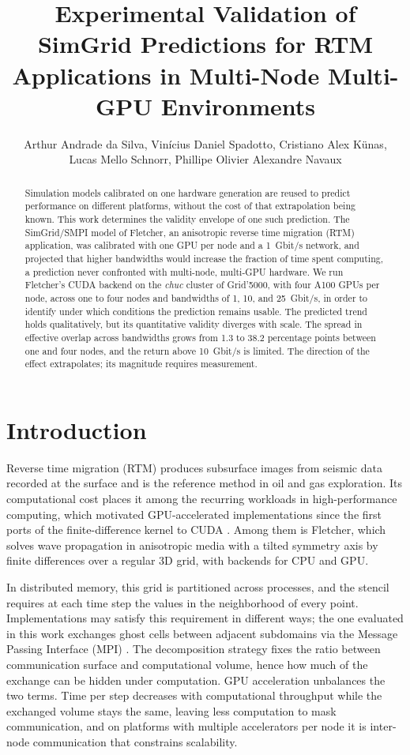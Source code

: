 \documentclass[12pt]{article}
\title{Experimental Validation of SimGrid Predictions for RTM Applications in Multi-Node Multi-GPU Environments}
\author{Arthur Andrade da Silva\inst{1}, Vin{\'i}cius Daniel Spadotto\inst{1}, Cristiano Alex Künas\inst{1},\\
Lucas Mello Schnorr\inst{1}, Phillipe Olivier Alexandre Navaux\inst{1}}
\begin{document}
 
\maketitle

\begin{abstract}
Simulation models calibrated on one hardware generation are reused to predict performance on different platforms, without the cost of that extrapolation being known. This work determines the validity envelope of one such prediction. The SimGrid/SMPI model of Fletcher, an anisotropic reverse time migration (RTM) application, was calibrated with one GPU per node and a 1~Gbit/s network, and projected that higher bandwidths would increase the fraction of time spent computing, a prediction never confronted with multi-node, multi-GPU hardware. We run Fletcher's CUDA backend on the \textit{chuc} cluster of Grid'5000, with four A100 GPUs per node, across one to four nodes and bandwidths of 1, 10, and 25~Gbit/s, in order to identify under which conditions the prediction remains usable. The predicted trend holds qualitatively, but its quantitative validity diverges with scale. The spread in effective overlap across bandwidths grows from 1.3 to 38.2 percentage points between one and four nodes, and the return above 10~Gbit/s is limited. The direction of the effect extrapolates; its magnitude requires measurement.
\end{abstract}

\section{Introduction}
Reverse time migration (RTM) produces subsurface images from seismic data recorded at the surface and is the reference method in oil and gas exploration. Its computational cost places it among the recurring workloads in high-performance computing, which motivated GPU-accelerated implementations since the first ports of the finite-difference kernel to CUDA \cite{micikevicius2009fd3d}. Among them is Fletcher, which solves wave propagation in anisotropic media with a tilted symmetry axis by finite differences over a regular 3D grid, with backends for CPU and GPU.

In distributed memory, this grid is partitioned across processes, and the stencil requires at each time step the values in the neighborhood of every point. Implementations may satisfy this requirement in different ways; the one evaluated in this work exchanges ghost cells between adjacent subdomains via the Message Passing Interface (MPI) \cite{spadotto2026sbacpad}. The decomposition strategy fixes the ratio between communication surface and computational volume, hence how much of the exchange can be hidden under computation. GPU acceleration unbalances the two terms. Time per step decreases with computational throughput while the exchanged volume stays the same, leaving less computation to mask communication, and on platforms with multiple accelerators per node it is inter-node communication that constrains scalability.
\end{document}
